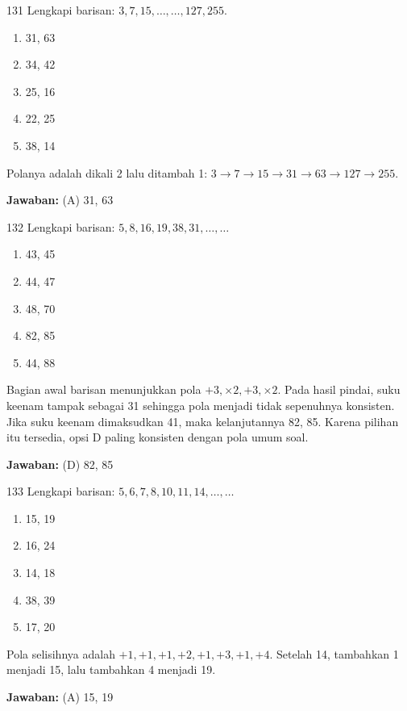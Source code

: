\documentclass[11pt]{article}
\newenvironment{pil}{\begin{enumerate}[label=(\Alph*),leftmargin=*,itemsep=1pt,topsep=3pt]}{\end{enumerate}}
\newcommand{\jw}[1]{\par\smallskip\begin{jawbox}\textbf{Jawaban:} #1\end{jawbox}}
\begin{document}
\begin{soalbox}{1}{31}
Lengkapi barisan: $3, 7, 15, \ldots, \ldots, 127, 255$.
\begin{pil}\item 31, 63 \item 34, 42 \item 25, 16 \item 22, 25 \item 38, 14\end{pil}
\end{soalbox}
\begin{pembox}
Polanya adalah dikali 2 lalu ditambah 1: $3\to7\to15\to31\to63\to127\to255$.
\jw{(A) 31, 63}
\end{pembox}

\begin{soalbox}{1}{32}
Lengkapi barisan: $5, 8, 16, 19, 38, 31, \ldots, \ldots$
\begin{pil}\item 43, 45 \item 44, 47 \item 48, 70 \item 82, 85 \item 44, 88\end{pil}
\end{soalbox}
\begin{pembox}
Bagian awal barisan menunjukkan pola $+3, \times2, +3, \times2$. Pada hasil pindai, suku keenam tampak sebagai 31 sehingga pola menjadi tidak sepenuhnya konsisten. Jika suku keenam dimaksudkan 41, maka kelanjutannya 82, 85. Karena pilihan itu tersedia, opsi D paling konsisten dengan pola umum soal.
\jw{(D) 82, 85}
\end{pembox}

\begin{soalbox}{1}{33}
Lengkapi barisan: $5, 6, 7, 8, 10, 11, 14, \ldots, \ldots$
\begin{pil}\item 15, 19 \item 16, 24 \item 14, 18 \item 38, 39 \item 17, 20\end{pil}
\end{soalbox}
\begin{pembox}
Pola selisihnya adalah $+1, +1, +1, +2, +1, +3, +1, +4$. Setelah 14, tambahkan 1 menjadi 15, lalu tambahkan 4 menjadi 19.
\jw{(A) 15, 19}
\end{pembox}
\end{document}
